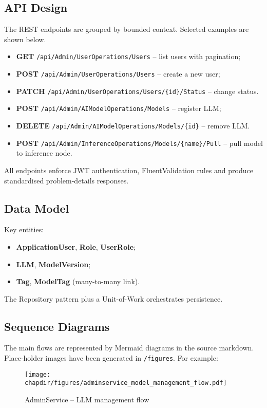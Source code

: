 \subsection{API Design}
The REST endpoints are grouped by bounded context.  Selected examples are shown below.
\begin{itemize}
  \item \textbf{GET} \texttt{/api/Admin/UserOperations/Users} – list users with pagination;
  \item \textbf{POST} \texttt{/api/Admin/UserOperations/Users} – create a new user;
  \item \textbf{PATCH} \texttt{/api/Admin/UserOperations/Users/\{id\}/Status} – change status.
  \item \textbf{POST} \texttt{/api/Admin/AIModelOperations/Models} – register LLM;
  \item \textbf{DELETE} \texttt{/api/Admin/AIModelOperations/Models/\{id\}} – remove LLM.
  \item \textbf{POST} \texttt{/api/Admin/InferenceOperations/Models/\{name\}/Pull} – pull model to inference node.
\end{itemize}
All endpoints enforce JWT authentication, FluentValidation rules and produce standardised problem-details responses.

\subsection{Data Model}
Key entities:
\begin{itemize}
  \item \textbf{ApplicationUser}, \textbf{Role}, \textbf{UserRole};
  \item \textbf{LLM}, \textbf{ModelVersion};
  \item \textbf{Tag}, \textbf{ModelTag} (many-to-many link).
\end{itemize}
The Repository pattern plus a Unit-of-Work orchestrates persistence.

\subsection{Sequence Diagrams}
The main flows are represented by Mermaid diagrams in the source markdown.  Place-holder images have been generated in \texttt{\chapdir/figures}.  For example:
\begin{sidewaysfigure}[h]
    \centering
    \texttt{[image: \\chapdir/figures/adminservice\_model\_management\_flow.pdf]}
    \caption{AdminService – LLM management flow}
    \label{fig:adminservice-model-flow}
\end{sidewaysfigure}

